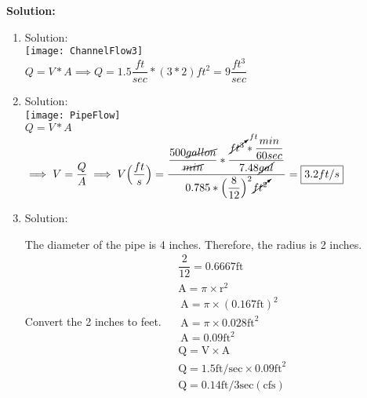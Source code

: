 \textbf{Solution:}\\

\begin{enumerate}

\item Solution:\\
\texttt{[image: ChannelFlow3]}\\
$Q=V*A \implies Q = 1.5 \dfrac{ft}{sec}*(3*2)ft^2=\boxed{9\dfrac{ft^3}{sec}}$

\item Solution:\\
\vspace{0.5cm}
\texttt{[image: PipeFlow]}\\
$Q=V*A$\\
$\implies V=\dfrac{Q}{A} \implies V \Big(\dfrac{ft}{s}\Big)= \dfrac{\dfrac{500\cancel{gallon}}{\cancel{min}}*\dfrac{\cancelto{ft}{ft^3}*\dfrac{min}{60sec}}{7.48\cancel{gal}}}{0.785*\Big(\dfrac{8}{12}\Big)^2\cancelto{}{ft^2}}=\boxed{3.2ft/s}$

\item Solution:\\

\vspace{0.5cm}

The diameter of the pipe is 4 inches. Therefore, the radius is 2 inches. Convert the 2 inches to feet.
$
\begin{aligned}
&\dfrac{2}{12}=0.6667 \mathrm{ft} \\
&\mathrm{A}=\pi \times \mathrm{r}^{2} \\
&\mathrm{~A}=\pi \times(0.167 \mathrm{ft})^{2} \\
&\mathrm{~A}=\pi \times 0.028 \mathrm{ft}^{2} \\
&\mathrm{~A}=0.09 \mathrm{ft}^{2} \\
&\mathrm{Q}=\mathrm{V} \times \mathrm{A} \\
&\mathrm{Q}=1.5 \mathrm{ft} / \mathrm{sec} \times 0.09 \mathrm{ft}^{2} \\
&\mathrm{Q}=0.14 \mathrm{ft} / 3 \mathrm{sec}(\mathrm{cfs})
\end{aligned}
$



\vspace{1cm}
\end{enumerate}
\vspace{1cm}

